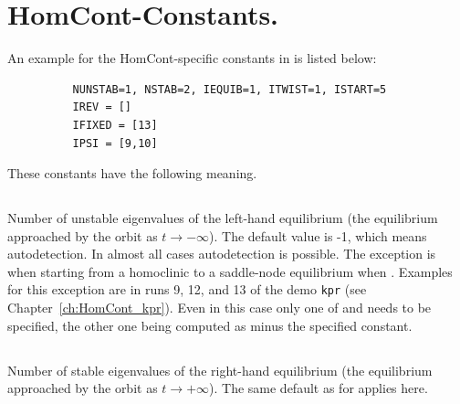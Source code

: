 \documentclass[12pt]{report}
\begin{document}
\section{ {\cal HomCont}-Constants.} \label{sec:HomCont_Constants}
An example for the HomCont-specific constants in  is listed below:
\begin{verbatim}
          NUNSTAB=1, NSTAB=2, IEQUIB=1, ITWIST=1, ISTART=5
          IREV = []
          IFIXED = [13]
          IPSI = [9,10]
\end{verbatim}
These constants have the following meaning. 

\subsection{}  \label{sec:NUNSTAB}

Number of unstable eigenvalues of the left-hand equilibrium (the equilibrium 
approached by the orbit as $t \to -\infty$). The default value is -1,
which means autodetection. In almost all cases autodetection is
possible. The exception is when starting from a homoclinic to a
saddle-node equilibrium when . Examples for this
exception are in runs 9, 12, and 13 of the
demo \texttt{kpr} (see Chapter~\ref{ch:HomCont_kpr}).
Even in this case
only one of  and  needs to be specified, the
other one being computed as  minus the specified constant.

\subsection{}  \label{sec:NSTAB}
Number of stable eigenvalues of the right-hand equilibrium (the equilibrium
approached by the orbit as $t \to +\infty$). The same default as for
 applies here.
\end{document}
